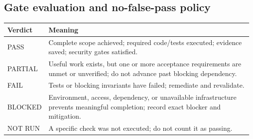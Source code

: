 \documentclass[10.5pt,a4paper,oneside]{article}
\begin{document}
\subsection{Gate evaluation and no-false-pass policy}
\begin{tabularx}{\textwidth}{@{}L{30mm}Y@{}}
\toprule{}\textbf{Verdict} & \textbf{Meaning}\\\midrule
PASS & Complete scope achieved; required code/tests executed; evidence saved; security gates satisfied.\\
PARTIAL & Useful work exists, but one or more acceptance requirements are unmet or unverified; do not advance past blocking dependency.\\
FAIL & Tests or blocking invariants have failed; remediate and revalidate.\\
BLOCKED & Environment, access, dependency, or unavailable infrastructure prevents meaningful completion; record exact blocker and mitigation.\\
NOT RUN & A specific check was not executed; do not count it as passing.\\
\bottomrule\end{tabularx}
\end{document}
